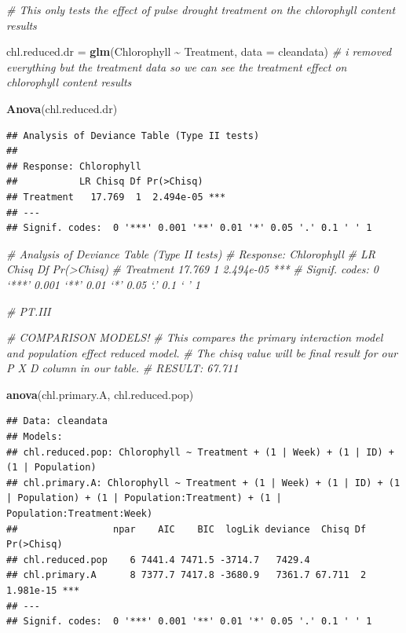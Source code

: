 \documentclass[
]{article}
\newenvironment{Shaded}{\begin{snugshade}}{\end{snugshade}}
\newcommand{\AttributeTok}[1]{\textcolor[rgb]{0.13,0.29,0.53}{#1}}
\newcommand{\CommentTok}[1]{\textcolor[rgb]{0.56,0.35,0.01}{\textit{#1}}}
\newcommand{\FunctionTok}[1]{\textcolor[rgb]{0.13,0.29,0.53}{\textbf{#1}}}
\newcommand{\NormalTok}[1]{#1}
\newcommand{\OtherTok}[1]{\textcolor[rgb]{0.56,0.35,0.01}{#1}}
\newcommand{\SpecialCharTok}[1]{\textcolor[rgb]{0.81,0.36,0.00}{\textbf{#1}}}
\begin{document}
\begin{Shaded}
\begin{Highlighting}[]
\CommentTok{\# This only tests the effect of pulse drought treatment on the chlorophyll content results}

\NormalTok{chl.reduced.dr }\OtherTok{=} \FunctionTok{glm}\NormalTok{(Chlorophyll }\SpecialCharTok{\textasciitilde{}}\NormalTok{ Treatment, }\AttributeTok{data =}\NormalTok{ cleandata)}
\CommentTok{\# i removed everything but the treatment data so we can see the treatment effect on chlorophyll content results}

\FunctionTok{Anova}\NormalTok{(chl.reduced.dr)}
\end{Highlighting}
\end{Shaded}

\begin{verbatim}
## Analysis of Deviance Table (Type II tests)
## 
## Response: Chlorophyll
##           LR Chisq Df Pr(>Chisq)    
## Treatment   17.769  1  2.494e-05 ***
## ---
## Signif. codes:  0 '***' 0.001 '**' 0.01 '*' 0.05 '.' 0.1 ' ' 1
\end{verbatim}

\begin{Shaded}
\begin{Highlighting}[]
\CommentTok{\# Analysis of Deviance Table (Type II tests)}
\CommentTok{\# Response: Chlorophyll}
          \CommentTok{\# LR Chisq Df Pr(\textgreater{}Chisq)    }
\CommentTok{\# Treatment   17.769  1  2.494e{-}05 ***}
\CommentTok{\# Signif. codes:  0 ‘***’ 0.001 ‘**’ 0.01 ‘*’ 0.05 ‘.’ 0.1 ‘ ’ 1}
\end{Highlighting}
\end{Shaded}

\begin{Shaded}
\begin{Highlighting}[]
\CommentTok{\# PT.III}

\CommentTok{\# COMPARISON MODELS!}
\CommentTok{\# This compares the primary interaction model and population effect reduced model.}
\CommentTok{\# The chisq value will be final result for our P X D column in our table.}
\CommentTok{\# RESULT: 67.711}

\FunctionTok{anova}\NormalTok{(chl.primary.A, chl.reduced.pop)}
\end{Highlighting}
\end{Shaded}

\begin{verbatim}
## Data: cleandata
## Models:
## chl.reduced.pop: Chlorophyll ~ Treatment + (1 | Week) + (1 | ID) + (1 | Population)
## chl.primary.A: Chlorophyll ~ Treatment + (1 | Week) + (1 | ID) + (1 | Population) + (1 | Population:Treatment) + (1 | Population:Treatment:Week)
##                 npar    AIC    BIC  logLik deviance  Chisq Df Pr(>Chisq)    
## chl.reduced.pop    6 7441.4 7471.5 -3714.7   7429.4                         
## chl.primary.A      8 7377.7 7417.8 -3680.9   7361.7 67.711  2  1.981e-15 ***
## ---
## Signif. codes:  0 '***' 0.001 '**' 0.01 '*' 0.05 '.' 0.1 ' ' 1
\end{verbatim}
\end{document}

